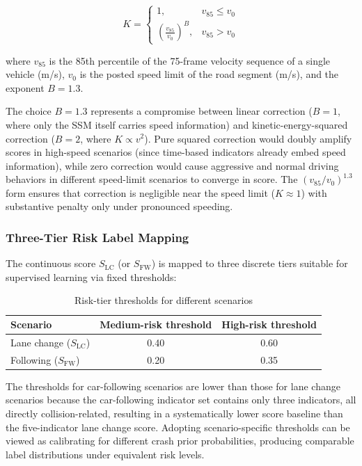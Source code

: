\documentclass[preprint,review,12pt,a4paper]{elsarticle}
\begin{document}
\begin{equation}
K = \begin{cases}
1, & v_{85} \leq v_0 \\[4pt]
\displaystyle\left(\frac{v_{85}}{v_0}\right)^{B}, & v_{85} > v_0
\end{cases}
\end{equation}

where $v_{85}$ is the 85th percentile of the 75-frame velocity sequence of a single vehicle (m/s), $v_0$ is the posted speed limit of the road segment (m/s), and the exponent $B = 1.3$.

The choice $B = 1.3$ represents a compromise between linear correction ($B = 1$, where only the SSM itself carries speed information) and kinetic-energy-squared correction ($B = 2$, where $K \propto v^2$). Pure squared correction would doubly amplify scores in high-speed scenarios (since time-based indicators already embed speed information), while zero correction would cause aggressive and normal driving behaviors in different speed-limit scenarios to converge in score. The $(v_{85}/v_0)^{1.3}$ form ensures that correction is negligible near the speed limit ($K \approx 1$) with substantive penalty only under pronounced speeding.

\subsubsection{Three-Tier Risk Label Mapping}

The continuous score $S_{\text{LC}}$ (or $S_{\text{FW}}$) is mapped to three discrete tiers suitable for supervised learning via fixed thresholds:

\begin{table}[H]
\centering
\caption{Risk-tier thresholds for different scenarios}
\label{tab:risk_thresholds}
\small
\begin{tabular}{lcc}
\toprule
Scenario & Medium-risk threshold & High-risk threshold \\
\midrule
Lane change ($S_{\text{LC}}$) & 0.40 & 0.60 \\
Following ($S_{\text{FW}}$)   & 0.20 & 0.35 \\
\bottomrule
\end{tabular}
\end{table}

The thresholds for car-following scenarios are lower than those for lane change scenarios because the car-following indicator set contains only three indicators, all directly collision-related, resulting in a systematically lower score baseline than the five-indicator lane change score. Adopting scenario-specific thresholds can be viewed as calibrating for different crash prior probabilities, producing comparable label distributions under equivalent risk levels.
\end{document}
